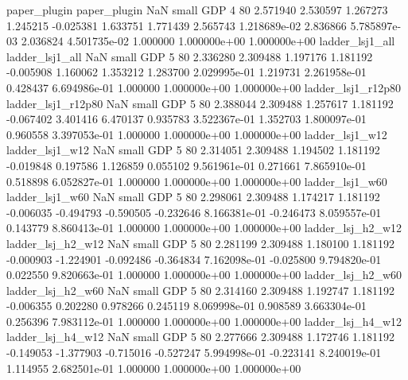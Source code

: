             paper_plugin             paper_plugin                   NaN      small      GDP                 4 80 2.571940       2.530597 1.267273       1.245215   -0.025381      1.633751      1.771439     2.565743   1.218689e-02  2.836866 5.785897e-03     2.036824   4.501735e-02            1.000000    1.000000e+00        1.000000e+00
         ladder_lsj1_all          ladder_lsj1_all                   NaN      small      GDP                 5 80 2.336280       2.309488 1.197176       1.181192   -0.005908      1.160062      1.353212     1.283700   2.029995e-01  1.219731 2.261958e-01     0.428437   6.694986e-01            1.000000    1.000000e+00        1.000000e+00
      ladder_lsj1_r12p80       ladder_lsj1_r12p80                   NaN      small      GDP                 5 80 2.388044       2.309488 1.257617       1.181192   -0.067402      3.401416      6.470137     0.935783   3.522367e-01  1.352703 1.800097e-01     0.960558   3.397053e-01            1.000000    1.000000e+00        1.000000e+00
         ladder_lsj1_w12          ladder_lsj1_w12                   NaN      small      GDP                 5 80 2.314051       2.309488 1.194502       1.181192   -0.019848      0.197586      1.126859     0.055102   9.561961e-01  0.271661 7.865910e-01     0.518898   6.052827e-01            1.000000    1.000000e+00        1.000000e+00
         ladder_lsj1_w60          ladder_lsj1_w60                   NaN      small      GDP                 5 80 2.298061       2.309488 1.174217       1.181192   -0.006035     -0.494793     -0.590505    -0.232646   8.166381e-01 -0.246473 8.059557e-01     0.143779   8.860413e-01            1.000000    1.000000e+00        1.000000e+00
       ladder_lsj_h2_w12        ladder_lsj_h2_w12                   NaN      small      GDP                 5 80 2.281199       2.309488 1.180100       1.181192   -0.000903     -1.224901     -0.092486    -0.364834   7.162098e-01 -0.025800 9.794820e-01     0.022550   9.820663e-01            1.000000    1.000000e+00        1.000000e+00
       ladder_lsj_h2_w60        ladder_lsj_h2_w60                   NaN      small      GDP                 5 80 2.314160       2.309488 1.192747       1.181192   -0.006355      0.202280      0.978266     0.245119   8.069998e-01  0.908589 3.663304e-01     0.256396   7.983112e-01            1.000000    1.000000e+00        1.000000e+00
       ladder_lsj_h4_w12        ladder_lsj_h4_w12                   NaN      small      GDP                 5 80 2.277666       2.309488 1.172746       1.181192   -0.149053     -1.377903     -0.715016    -0.527247   5.994998e-01 -0.223141 8.240019e-01     1.114955   2.682501e-01            1.000000    1.000000e+00        1.000000e+00
